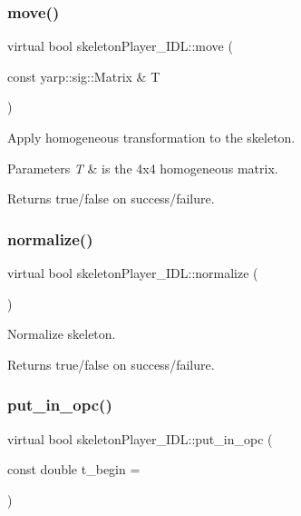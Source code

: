 \subsubsection{\texorpdfstring{move()}{move()}}
{\footnotesize\ttfamily virtual bool skeleton\+Player\+\_\+\+I\+D\+L\+::move (\begin{DoxyParamCaption}\item[{const yarp\+::sig\+::\+Matrix \&}]{T }\end{DoxyParamCaption})\hspace{0.3cm}{\ttfamily [virtual]}}



Apply homogeneous transformation to the skeleton. 


\begin{DoxyParams}{Parameters}
{\em T} & is the 4x4 homogeneous matrix. \\
\hline
\end{DoxyParams}
\begin{DoxyReturn}{Returns}
true/false on success/failure. 
\end{DoxyReturn}
\mbox{\label{classskeletonPlayer__IDL_ab77b1ce1855a8fbdc352ac22ed9a6cf4}} 
\subsubsection{\texorpdfstring{normalize()}{normalize()}}
{\footnotesize\ttfamily virtual bool skeleton\+Player\+\_\+\+I\+D\+L\+::normalize (\begin{DoxyParamCaption}{ }\end{DoxyParamCaption})\hspace{0.3cm}{\ttfamily [virtual]}}



Normalize skeleton. 

\begin{DoxyReturn}{Returns}
true/false on success/failure. 
\end{DoxyReturn}
\mbox{\label{classskeletonPlayer__IDL_a9b02f3ee360ef27a1ec1b3f321fa5ed7}} 
\subsubsection{\texorpdfstring{put\+\_\+in\+\_\+opc()}{put\_in\_opc()}}
{\footnotesize\ttfamily virtual bool skeleton\+Player\+\_\+\+I\+D\+L\+::put\+\_\+in\+\_\+opc (\begin{DoxyParamCaption}\item[{const double}]{t\+\_\+begin = {} }\end{DoxyParamCaption})\hspace{0.3cm}{\ttfamily [virtual]}}



